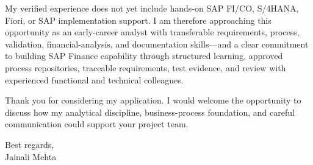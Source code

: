 \documentclass[letterpaper,11pt]{article}
\begin{document}
\bigbreak
My verified experience does not yet include hands-on SAP FI/CO, S/4HANA, Fiori, or SAP implementation support. I am therefore approaching this opportunity as an early-career analyst with transferable requirements, process, validation, financial-analysis, and documentation skills—and a clear commitment to building SAP Finance capability through structured learning, approved process repositories, traceable requirements, test evidence, and review with experienced functional and technical colleagues.

\bigbreak
Thank you for considering my application. I would welcome the opportunity to discuss how my analytical discipline, business-process foundation, and careful communication could support your project team.

\bigbreak
Best regards,\\
Jainali Mehta
\end{document}

